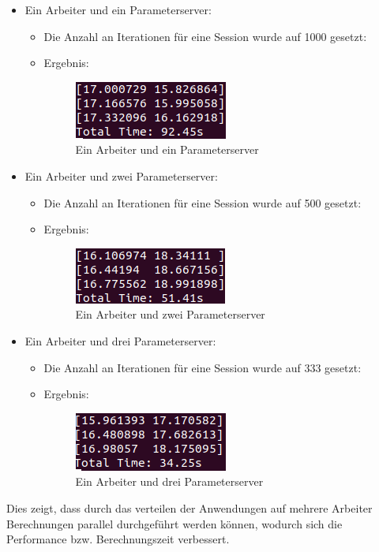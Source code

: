 \begin{itemize}
	\item Ein Arbeiter und ein Parameterserver:
	\begin{itemize}
		\item Die Anzahl an Iterationen für eine Session wurde auf 1000 gesetzt:
		\item Ergebnis:
			\begin{figure}[!h]
				\centering
				\includegraphics[width=0.5\linewidth]{Pictures/1worker1ps}
				\caption{Ein Arbeiter und ein Parameterserver}
				\label{fig:1worker1ps}
			\end{figure}
	\end{itemize}
	\item Ein Arbeiter und zwei Parameterserver:
	\begin{itemize}
		\item Die Anzahl an Iterationen für eine Session wurde auf 500 gesetzt:
		\item Ergebnis:
			\begin{figure}[!h]
				\centering
				\includegraphics[width=0.5\linewidth]{Pictures/2worker1ps}
				\caption{Ein Arbeiter und zwei Parameterserver}
				\label{fig:2worker1ps}
			\end{figure}
	\end{itemize}
	\item Ein Arbeiter und drei Parameterserver:
	\begin{itemize}
		\item Die Anzahl an Iterationen für eine Session wurde auf 333 gesetzt:
		\item Ergebnis:
			\begin{figure}[!h]
				\centering
				\includegraphics[width=0.5\linewidth]{Pictures/3worker1ps}
				\caption{Ein Arbeiter und drei Parameterserver}
				\label{fig:3worker1ps}
			\end{figure}			
	\end{itemize}
\end{itemize}

Dies zeigt, dass durch das verteilen der Anwendungen auf mehrere Arbeiter Berechnungen parallel durchgeführt werden können, wodurch sich die Performance bzw. Berechnungszeit verbessert.